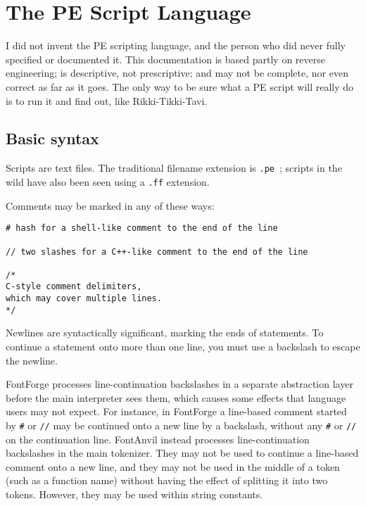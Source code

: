 \chapter{The PE Script Language}

\begin{framed}
I did not invent the PE scripting language, and the person who did never
fully specified or documented it.  This documentation is based partly on
reverse engineering; is descriptive, not prescriptive; and may not be
complete, nor even correct as far as it goes.  The only way to be sure
what a PE script will really do is to run it and find out, like
Rikki-Tikki-Tavi.
\end{framed}

\section{Basic syntax}

Scripts are text files.  The traditional filename extension is \texttt{.pe}~;
scripts in the wild have also been seen using a \texttt{.ff} extension.

Comments may be marked in any of these ways:
\begin{verbatim}
# hash for a shell-like comment to the end of the line

// two slashes for a C++-like comment to the end of the line

/*
C-style comment delimiters,
which may cover multiple lines.
*/
\end{verbatim}

\begin{framed}
Newlines are syntactically significant, marking the ends of
statements.
To continue a statement onto more than one line, you must use a backslash to
escape the newline.  
\end{framed}

FontForge \FFdiff processes line-continuation backslashes in a separate
abstraction layer before the main interpreter sees them, which causes some
effects that language users may not expect.  For instance, in FontForge a
line-based comment started by \texttt{\#} or \texttt{//} may be continued
onto a new line by a backslash, without any \texttt{\#} or \texttt{//} on
the continuation line.  FontAnvil instead processes
line-continuation backslashes in the main tokenizer.  They may not be used
to continue a line-based comment onto a new line, and they may not be used
in the middle of a token (such as a function name) without having the effect
of splitting it into two tokens.  However, they may be used within string
constants.

